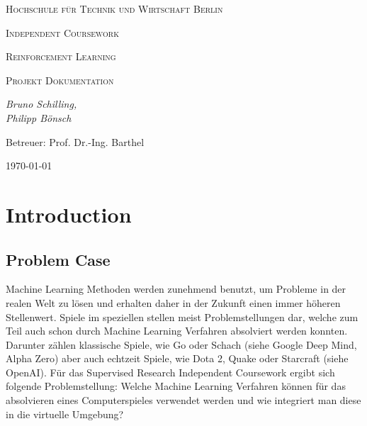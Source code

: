 \documentclass[11pt]{scrartcl}
\begin{document}

\begin{titlepage}
	\centering
	{\scshape\LARGE Hochschule für Technik und Wirtschaft Berlin \par}
	\vspace{2cm}
	{\Huge \scshape{Independent Coursework}\par}
	\vspace{2cm}
	{\LARGE \scshape{Reinforcement Learning}\par}
	{\scshape\Large Projekt Dokumentation\par}
	\vspace{4cm}
	{\large\itshape Bruno Schilling,\\Philipp Bönsch\par}
	\vfill
	
	{\large Betreuer: Prof. Dr.-Ing. Barthel \par}
	\vspace{1cm}
	{\large \today\par}
\end{titlepage}

\lstset{basicstyle=\ttfamily\small,breaklines=true}
\newpage
\tableofcontents
\newpage
\section{Introduction}

\subsection{Problem Case}
Machine Learning Methoden werden zunehmend benutzt, um Probleme in der realen Welt zu
lösen und erhalten daher in der Zukunft einen immer höheren Stellenwert. Spiele im
speziellen stellen meist Problemstellungen dar, welche zum Teil auch schon durch Machine
Learning Verfahren absolviert werden konnten. Darunter zählen klassische Spiele, wie Go
oder Schach (siehe Google Deep Mind, Alpha Zero) aber auch echtzeit Spiele, wie Dota 2,
Quake oder Starcraft (siehe OpenAI). Für das Supervised Research Independent Coursework
ergibt sich folgende Problemstellung: Welche Machine Learning Verfahren können für das
absolvieren eines Computerspieles verwendet werden und wie integriert man diese in die
virtuelle Umgebung?
\end{document}
